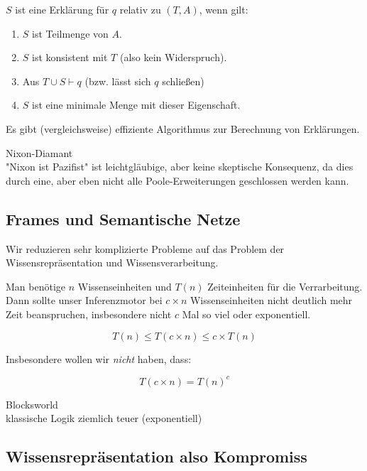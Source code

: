 \documentclass[runningheads,deutsch]{llncs}
\begin{document}
\begin{solution}$S$ ist eine Erklärung für $q$ relativ zu $(T,A)$, wenn gilt:

\begin{enumerate}
    \item $S$ ist Teilmenge von $A$.
    \item $S$ ist konsistent mit $T$ (also kein Widerspruch).
    \item Aus $T \cup S \vdash q$ (bzw. lässt sich $q$ schließen)
    \item $S$ ist eine minimale Menge mit dieser Eigenschaft.
\end{enumerate}

Es gibt (vergleichsweise) effiziente Algorithmus zur Berechnung von Erklärungen.

\end{solution}

\begin{example} Nixon-Diamant\\
    "Nixon ist Pazifist" ist leichtgläubige, aber keine skeptische Konsequenz, da dies durch eine, aber eben nicht alle Poole-Erweiterungen geschlossen werden kann.
\end{example}

\subsection{Frames und Semantische Netze}

Wir reduzieren sehr komplizierte Probleme auf das Problem der Wissensrepräsentation und Wissensverarbeitung.

Man benötige $n$ Wissenseinheiten und $T(n)$ Zeiteinheiten für die Verrarbeitung. Dann sollte unser Inferenzmotor bei $c \times n$ Wissenseinheiten nicht deutlich mehr Zeit beanspruchen, insbesondere nicht $c$ Mal so viel oder exponentiell.

\[ T(n) \leq T(c \times n) \leq c \times T(n) \]

Insbesondere wollen wir \textit{nicht} haben, dass:

\[ T(c \times n) = T(n)^c \]

\begin{example}Blocksworld \\
    klassische Logik ziemlich teuer (exponentiell)
\end{example}

\subsection{Wissensrepräsentation also Kompromiss}
\end{document}
